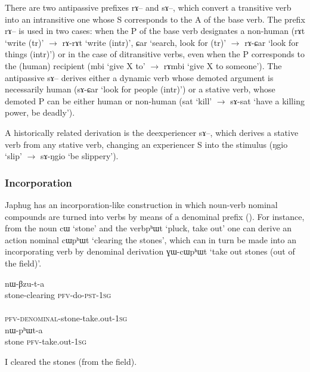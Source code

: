 \documentclass[oldfontcommands,oneside,a4paper,11pt]{article}
\newcommand{\ipa}[1]{{\phon#1}} %
\begin{document}
There are two antipassive prefixes \ipa{rɤ--} and \ipa{sɤ--}, which convert a transitive verb into an intransitive one whose S corresponds to the A of the base verb. The prefix \ipa{rɤ--} is used in two cases: when the P of the base verb designates a non-human (\ipa{rɤt} `write (tr)' $\rightarrow$ \ipa{rɤ-rɤt} `write (intr)', \ipa{ɕar} `search, look for (tr)' $\rightarrow$ \ipa{rɤ-ɕar} `look for things (intr)') or in the case of ditransitive verbs, even when the P corresponds to the (human) recipient (\ipa{mbi} `give X to' $\rightarrow$ \ipa{rɤmbi} `give X to someone'). The antipassive \ipa{sɤ--} derives either a dynamic verb whose demoted argument is necessarily human (\ipa{sɤ-ɕar} `look for people (intr)') or a stative verb, whose demoted P can be either human or non-human (\ipa{sat} `kill' $\rightarrow$ \ipa{sɤ-sat} `have a killing power, be deadly'). 

A historically related derivation is the deexperiencer \ipa{sɤ--}, which derives a stative verb from any stative verb, changing an experiencer S into the stimulus (\ipa{ŋgio} `slip' $\rightarrow$ \ipa{sɤ-ŋgio} `be slippery').

\subsubsection{Incorporation}
Japhug has an incorporation-like construction in which noun-verb nominal compounds are turned into verbs by means of a denominal prefix (\citealt{jacques12incorp}). For instance, from the noun \ipa{cɯ} `stone' and the verb\ipa{pʰɯt} `pluck, take out' one can derive an action nominal    \ipa{cɯpʰɯt} `clearing the stones', which can in turn be made into an incorporating verb by denominal derivation  \ipa{ɣɯ-cɯpʰɯt } `take out stones (out of the field)'.

\begin{exe}   
\ex
\begin{xlist}[(ii)]
\gll     \ipa{cɯ-pʰɯt} \ipa{nɯ-βzu-t-a}  \\
  stone-clearing \textsc{pfv}-do-\textsc{pst}-\textsc{1sg} \\
\gll     \ipa{nɯ-ɣɯ-cɯ-pʰɯt-a}  \\
  \textsc{pfv-denominal}-stone-take.out-\textsc{1sg} \\
\gll     \ipa{cɯ} \ipa{nɯ-pʰɯt-a}  \\
  stone \textsc{pfv}-take.out-\textsc{1sg} \\
  \end{xlist}
 \glt   I cleared the stones (from the field). 
\end{exe}   
\end{document}
